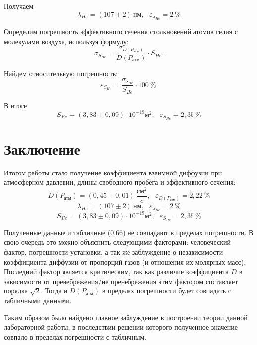 \documentclass[a4paper,11.5pt]{article} %
\begin{document}
Получаем
\begin{equation}
	\lambda_{He} = (107 \pm 2)\ \text{нм}, \ ~ \ \varepsilon_{\lambda_{He}} = 2\ \%
\end{equation}


Определим погрешность эффективного сечения столкновений атомов гелия с молекулами воздуха, используя формулу:  
\begin{equation}
	\sigma_{S_{He}} = \dfrac{\sigma_{D(P_{\text{атм}})}}{D(P_{\text{атм}})} \cdot S_{He}.
\end{equation}

Найдем относительную погрешность:
\begin{equation}
	\varepsilon_{S_{He}} = \dfrac{\sigma_{S_{He}}}{S_{He}}\cdot 100\ \%\ 
\end{equation}

В итоге
\begin{equation}
	S_{He} = (3,83 \pm 0,09) \cdot 10^{-19} \text{м}^2,\ ~ \  \varepsilon_{S_{He}} = 2,35\ \%
\end{equation}
\newpage

\section{Заключение}

Итогом работы стало получение коэффициента взаимной диффузии при атмосферном давлении, длины свободного пробега и эффективного сечения:
\[D(P_{\text{атм}}) = (0,45 \pm 0,01)\ \frac{\text{см}^2}{c}, \ ~ \ \varepsilon_{D(P_{\text{атм}})} = 2,22\ \% \]
\[\lambda_{He} = (107 \pm 2)\ \text{нм}, \ ~ \ \varepsilon_{\lambda_{He}} = 2\ \%\]
\[S_{He} = (3,83 \pm 0,09) \cdot 10^{-19} \text{м}^2,\ ~ \  \varepsilon_{S_{He}} = 2,35\ \% \]
 
 
Полученные данные и табличные ($0.66$) не совпадают в пределах погрешности. В свою очередь это можно объяснить следующими факторами: человеческий фактор, погрешности установки, а так же заблуждение о независимости коэффициента диффузии от пропорций газов (и отношения их молярных масс). Последний фактор является критическим, так как различие коэффициента $D$ в зависимости от пренебрежения/не пренебрежения этим фактором составляет порядка $\sqrt{2}$. Тогда и $D(P_{\text{атм}})$ в пределах погрешности будет совпадать с табличными данными.

Таким образом было найдено главное заблуждение в построении теории данной лабораторной работы, в последствии решении которого полученное значение совпало в пределах погрешности с табличным.
\end{document}
